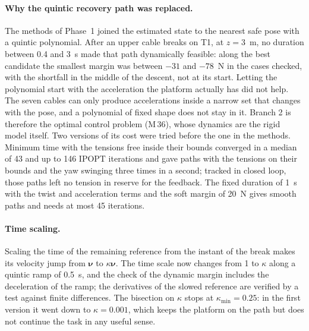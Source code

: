 \documentclass[10pt]{article}
\newcommand{\vc}[1]{\bm{#1}}
\begin{document}
\paragraph{Why the quintic recovery path was replaced.} The methods of Phase~1 joined the estimated state to the nearest safe pose with a quintic polynomial. After an upper cable breaks on T1, at $z=3$~m, no duration between 0.4 and 3~s made that path dynamically feasible: along the best candidate the smallest margin was between $-31$ and $-78$~N in the cases checked, with the shortfall in the middle of the descent, not at its start. Letting the polynomial start with the acceleration the platform actually has did not help. The seven cables can only produce accelerations inside a narrow set that changes with the pose, and a polynomial of fixed shape does not stay in it. Branch 2 is therefore the optimal control problem (M\,36), whose dynamics are the rigid model itself. Two versions of its cost were tried before the one in the methods. Minimum time with the tensions free inside their bounds converged in a median of 43 and up to 146 IPOPT iterations and gave paths with the tensions on their bounds and the yaw swinging three times in a second; tracked in closed loop, those paths left no tension in reserve for the feedback. The fixed duration of 1~s with the twist and acceleration terms and the soft margin of 20~N gives smooth paths and needs at most 45 iterations.

\paragraph{Time scaling.} Scaling the time of the remaining reference from the instant of the break makes its velocity jump from $\vc\nu$ to $\kappa\vc\nu$. The time scale now changes from 1 to $\kappa$ along a quintic ramp of 0.5~s, and the check of the dynamic margin includes the deceleration of the ramp; the derivatives of the slowed reference are verified by a test against finite differences. The bisection on $\kappa$ stops at $\kappa_{\min}=0.25$: in the first version it went down to $\kappa=0.001$, which keeps the platform on the path but does not continue the task in any useful sense.
\end{document}
